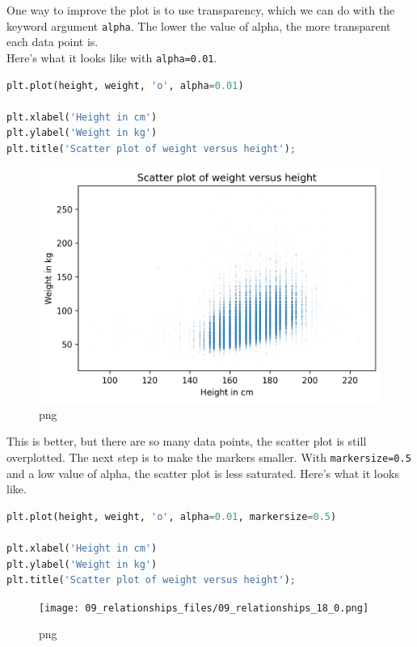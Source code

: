 \documentclass[
]{book}
\newcommand{\passthrough}[1]{#1}
\begin{document}
One way to improve the plot is to use transparency, which we can do with
the keyword argument \passthrough{\lstinline!alpha!}. The lower the
value of alpha, the more transparent each data point is.\\
Here's what it looks like with \passthrough{\lstinline!alpha=0.01!}.

\begin{lstlisting}[language=Python]
plt.plot(height, weight, 'o', alpha=0.01)

plt.xlabel('Height in cm')
plt.ylabel('Weight in kg')
plt.title('Scatter plot of weight versus height');
\end{lstlisting}

\begin{figure}
\centering
\includegraphics{09_relationships_files/09_relationships_16_0.png}
\caption{png}
\end{figure}

This is better, but there are so many data points, the scatter plot is
still overplotted. The next step is to make the markers smaller. With
\passthrough{\lstinline!markersize=0.5!} and a low value of alpha, the
scatter plot is less saturated. Here's what it looks like.

\begin{lstlisting}[language=Python]
plt.plot(height, weight, 'o', alpha=0.01, markersize=0.5)

plt.xlabel('Height in cm')
plt.ylabel('Weight in kg')
plt.title('Scatter plot of weight versus height');
\end{lstlisting}

\begin{figure}
\centering
\texttt{[image: 09\_relationships\_files/09\_relationships\_18\_0.png]}
\caption{png}
\end{figure}
\end{document}
